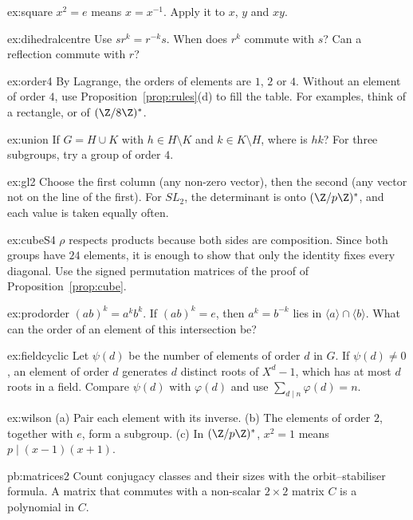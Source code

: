 \begin{hint}{ex:square}
$x^2=e$ means $x=x^{-1}$. Apply it to $x$, $y$ and $xy$.
\end{hint}
\begin{hint}{ex:dihedralcentre}
Use $sr^k=r^{-k}s$. When does $r^k$ commute with $s$? Can a reflection commute with $r$?
\end{hint}
\begin{hint}{ex:order4}
By Lagrange, the orders of elements are $1$, $2$ or $4$. Without an element of order $4$, use Proposition~\ref{prop:rules}(d) to fill the table. For examples, think of a rectangle, or of $(\Z/8\Z)^*$.
\end{hint}
\begin{hint}{ex:union}
If $G=H\cup K$ with $h\in H\setminus K$ and $k\in K\setminus H$, where is $hk$? For three subgroups, try a group of order $4$.
\end{hint}
\begin{hint}{ex:gl2}
Choose the first column (any non-zero vector), then the second (any vector not on the line of the first). For $SL_2$, the determinant is onto $(\Z/p\Z)^*$, and each value is taken equally often.
\end{hint}
\begin{hint}{ex:cubeS4}
$\rho$ respects products because both sides are composition. Since both groups have $24$ elements, it is enough to show that only the identity fixes every diagonal. Use the signed permutation matrices of the proof of Proposition~\ref{prop:cube}.
\end{hint}
\begin{hint}{ex:prodorder}
$(ab)^k=a^kb^k$. If $(ab)^k=e$, then $a^k=b^{-k}$ lies in $\langle a\rangle\cap\langle b\rangle$. What can the order of an element of this intersection be?
\end{hint}
\begin{hint}{ex:fieldcyclic}
Let $\psi(d)$ be the number of elements of order $d$ in $G$. If $\psi(d)\ne0$, an element of order $d$ generates $d$ distinct roots of $X^d-1$, which has at most $d$ roots in a field. Compare $\psi(d)$ with $\varphi(d)$ and use $\sum_{d\mid n}\varphi(d)=n$.
\end{hint}
\begin{hint}{ex:wilson}
(a) Pair each element with its inverse. (b) The elements of order $2$, together with $e$, form a subgroup. (c) In $(\Z/p\Z)^*$, $x^2=1$ means $p\mid(x-1)(x+1)$.
\end{hint}

\begin{hint}{pb:matrices2}
Count conjugacy classes and their sizes with the orbit--stabiliser formula. A matrix that commutes with a non-scalar
$2\times2$ matrix $C$ is a polynomial in $C$.
\end{hint}

